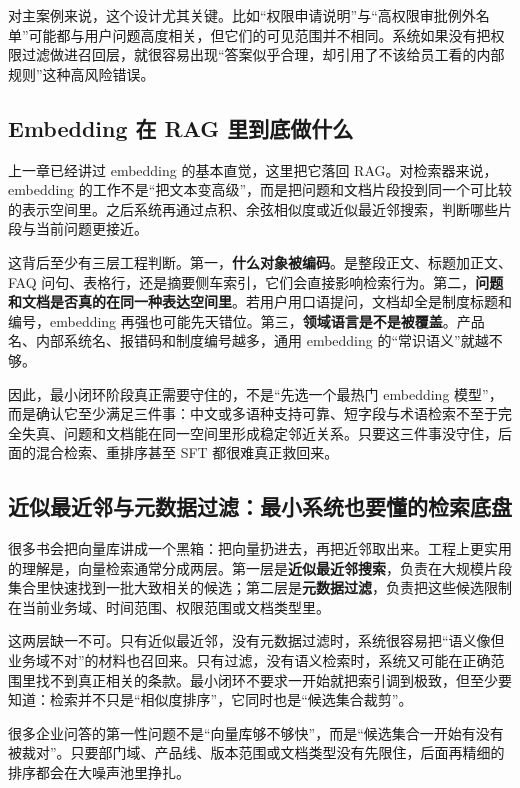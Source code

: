 对主案例来说，这个设计尤其关键。比如“权限申请说明”与“高权限审批例外名单”可能都与用户问题高度相关，但它们的可见范围并不相同。系统如果没有把权限过滤做进召回层，就很容易出现“答案似乎合理，却引用了不该给员工看的内部规则”这种高风险错误。

\subsection{Embedding 在 RAG 里到底做什么}
上一章已经讲过 embedding 的基本直觉，这里把它落回 RAG。对检索器来说，embedding 的工作不是“把文本变高级”，而是把问题和文档片段投到同一个可比较的表示空间里。之后系统再通过点积、余弦相似度或近似最近邻搜索，判断哪些片段与当前问题更接近。

这背后至少有三层工程判断。第一，\textbf{什么对象被编码}。是整段正文、标题加正文、FAQ 问句、表格行，还是摘要侧车索引，它们会直接影响检索行为。第二，\textbf{问题和文档是否真的在同一种表达空间里}。若用户用口语提问，文档却全是制度标题和编号，embedding 再强也可能先天错位。第三，\textbf{领域语言是不是被覆盖}。产品名、内部系统名、报错码和制度编号越多，通用 embedding 的“常识语义”就越不够。

因此，最小闭环阶段真正需要守住的，不是“先选一个最热门 embedding 模型”，而是确认它至少满足三件事：中文或多语种支持可靠、短字段与术语检索不至于完全失真、问题和文档能在同一空间里形成稳定邻近关系。只要这三件事没守住，后面的混合检索、重排序甚至 SFT 都很难真正救回来。

\subsection{近似最近邻与元数据过滤：最小系统也要懂的检索底盘}
很多书会把向量库讲成一个黑箱：把向量扔进去，再把近邻取出来。工程上更实用的理解是，向量检索通常分成两层。第一层是\textbf{近似最近邻搜索}，负责在大规模片段集合里快速找到一批大致相关的候选；第二层是\textbf{元数据过滤}，负责把这些候选限制在当前业务域、时间范围、权限范围或文档类型里。

这两层缺一不可。只有近似最近邻，没有元数据过滤时，系统很容易把“语义像但业务域不对”的材料也召回来。只有过滤，没有语义检索时，系统又可能在正确范围里找不到真正相关的条款。最小闭环不要求一开始就把索引调到极致，但至少要知道：检索并不只是“相似度排序”，它同时也是“候选集合裁剪”。

\begin{note}
很多企业问答的第一性问题不是“向量库够不够快”，而是“候选集合一开始有没有被裁对”。只要部门域、产品线、版本范围或文档类型没有先限住，后面再精细的排序都会在大噪声池里挣扎。
\end{note}

